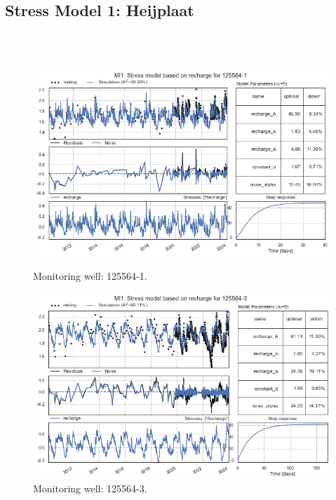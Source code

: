\subsection{Stress Model 1: Heijplaat}\\
\\
\begin{figure}[htbp]
    \centering
    \begin{minipage}{0.32\textwidth}
        \centering
        \includegraphics[width=\linewidth]{frontmatter/Heijplaat-fig/1.png}
        \caption{Monitoring well: 125564-1.}
        \label{SM: 125564-1}
    \end{minipage}
    \hfill
    \begin{minipage}{0.32\textwidth}
        \centering
        \includegraphics[width=\linewidth]{frontmatter/Heijplaat-fig/2.png}
        \caption{Monitoring well: 125564-3.}
        \label{SM: 125564-3}
    \end{minipage}

\end{figure}
